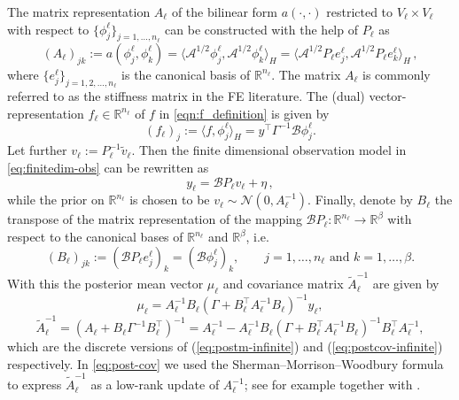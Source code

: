 \documentclass[11pt,english]{article}
\theoremstyle{plain}
\theoremstyle{plain}
\theoremstyle{plain}
\theoremstyle{plain}
\numberwithin{equation}{section}
\newcommand{\jg}[1]{#1}
\begin{document}
The matrix representation $A_{\ell}$  of the bilinear form $a(\cdot,\cdot)$ restricted to $V_{\ell}\times V_{\ell}$ with respect to $\{\phi_{j}^{\ell}\}_{j=1,\dots,n_{\ell}}$ can be constructed with the help of $P_\ell$ as
\begin{equation}
	(A_{\ell})_{jk}:=a(\phi_j^\ell,\phi_k^\ell) = \langle\mathcal{A}^{1/2}\phi_{j}^{\ell},\mathcal{A}^{1/2}\phi_{k}^{\ell}\rangle_{H}=\langle\mathcal{A}^{1/2}P_{\ell}e_{j}^{\ell},\mathcal{A}^{1/2}P_{\ell}e_{k}^{\ell}\rangle_{H}\,,\label{eq:def-A_ell}
      \end{equation}
where $\{e_{j}^\ell\}_{j=1,2,\dots,n_\ell}$ is the canonical basis of $\mathbb{R}^{n_{\ell}}$. 
\jg{The matrix $A_\ell$ is commonly referred to as the stiffness
  matrix in the FE literature.}  
The (dual) vector-representation $f_\ell\in\mathbb{R}^{n_\ell}$ of $f$ in \eqref{eqn:f_definition} is given by
\begin{equation}
	(f_\ell)_j := \langle f,\phi_j^\ell\rangle_H = y^\top \Gamma^{-1}\mathcal{B}\phi_j^\ell.\label{eqn:f_ell_definition}
\end{equation}
Let further $v_{\ell}:=P_{\ell}^{-1}\tilde{v}_{\ell}$. Then the finite dimensional observation model in \eqref{eq:finitedim-obs} can be rewritten as
\[
	y_{\ell}=\mathcal{B}P_{\ell}v_{\ell}+\eta\,,
\]
while the prior on $\mathbb{R}^{n_{\ell}}$ is chosen to be
$v_{\ell}\sim\mathcal{N}(0,A_{\ell}^{-1})$. Finally, denote by $B_{\ell}$ 
the transpose of the matrix representation of the mapping $\mathcal{B}P_{\ell}\colon\mathbb{R}^{n_{\ell}}\to\mathbb{R}^{\beta}$
with respect to the canonical bases of $\mathbb{R}^{n_\ell}$ and $\mathbb{R}^{\beta}$, i.e.
\begin{equation}
	(B_{\ell})_{jk}:=(\mathcal{B}P_{\ell}e_{j}^\ell)_{k}=(\mathcal{B}\phi_{j}^{\ell})_{k},\qquad j=1,\dots,n_{\ell}\text{ and }k=1,\dots,\beta.\label{eqn:B_ell_definition}
\end{equation}
With this the posterior mean vector $\mu_{\ell}$ and covariance matrix $\widetilde{A}_{\ell}^{-1}$ are given by
\begin{equation}
	\mu_{\ell}=A_{\ell}^{-1}B_{\ell}(\Gamma+B_{\ell}^{\top}A_{\ell}^{-1}B_{\ell})^{-1}y_{\ell},\label{eq:post-mean}
\end{equation}
\begin{equation}
	\widetilde{A}_{\ell}^{-1}=(A_{\ell}+B_{\ell}\Gamma^{-1}B_{\ell}^{\top})^{-1}=A_{\ell}^{-1}-A_{\ell}^{-1}B_{\ell}(\Gamma+B_{\ell}^{\top}A_{\ell}^{-1}B_{\ell})^{-1}B_{\ell}^{\top}A_{\ell}^{-1},\label{eq:post-cov}
      \end{equation}
\noindent
which are the discrete versions of (\ref{eq:postm-infinite}) and (\ref{eq:postcov-infinite}) respectively. In \eqref{eq:post-cov} we used the Sherman--Morrison--Woodbury formula to express $\widetilde{A}_{\ell}^{-1}$ as a low-rank update of $A_\ell^{-1}$; see for example \cite[Theorem 6.20, (2.16)]{Stuart.A_2010_Acta_Inverse} together with \cite[Chapter 0]{Horn.R_Johnson_book_2013_2nd}.
\end{document}
